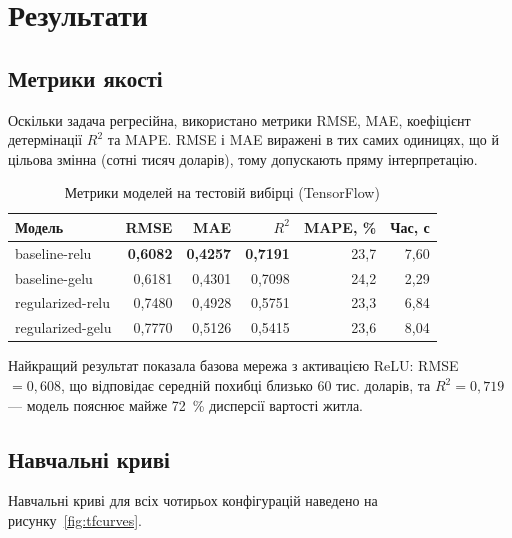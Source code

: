 \documentclass[14pt,a4paper]{extreport}
\begin{document}
\begin{listing}[H]
\inputminted[firstline=51,lastline=89]{python}{../src/aiit/run_lab1.py}
\caption{Цикл навчання та оцінювання (\texttt{src/run\_lab1.py})}
\label{lst:run1}
\end{listing}

\section{Результати}

\subsection{Метрики якості}

Оскільки задача регресійна, використано метрики RMSE, MAE, коефіцієнт детермінації $R^2$ та MAPE. RMSE і MAE виражені в тих самих одиницях, що й цільова змінна (сотні тисяч доларів), тому допускають пряму інтерпретацію.

\begin{table}[H]
\caption{Метрики моделей на тестовій вибірці (TensorFlow)}
\label{tab:tfresults}
\begin{tabularx}{\linewidth}{|X|r|r|r|r|r|}
\hline
\textbf{Модель} & \textbf{RMSE} & \textbf{MAE} & \textbf{$R^2$} & \textbf{MAPE, \%} & \textbf{Час, с} \\
\hline
baseline-relu       & \textbf{0,6082} & \textbf{0,4257} & \textbf{0,7191} & 23,7 & 7,60 \\
\hline
baseline-gelu       & 0,6181 & 0,4301 & 0,7098 & 24,2 & 2,29 \\
\hline
regularized-relu    & 0,7480 & 0,4928 & 0,5751 & 23,3 & 6,84 \\
\hline
regularized-gelu    & 0,7770 & 0,5126 & 0,5415 & 23,6 & 8,04 \\
\hline
\end{tabularx}
\end{table}

Найкращий результат показала базова мережа з активацією ReLU: RMSE $= 0{,}608$, що відповідає середній похибці близько 60 тис. доларів, та $R^2 = 0{,}719$ --- модель пояснює майже 72~\% дисперсії вартості житла.

\subsection{Навчальні криві}

Навчальні криві для всіх чотирьох конфігурацій наведено на рисунку~\ref{fig:tfcurves}.
\end{document}
